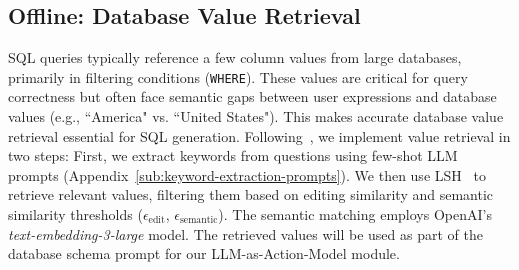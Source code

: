\subsection{Offline: Database Value Retrieval}
\label{sub:offline-preprocess}
SQL queries typically reference a few column values from large databases, primarily in filtering conditions (\eg \texttt{WHERE}). These values are critical for query correctness but often face semantic gaps between user expressions and database values (e.g., ``America" vs. ``United States"). This makes accurate database value retrieval essential for SQL generation. Following~\citet{chesssql}, we implement value retrieval in two steps:
% 
First, we extract keywords from questions using few-shot LLM prompts ({Appendix}~\ref{sub:keyword-extraction-prompts}). We then use LSH~\cite{LSH} to retrieve relevant values, filtering them based on editing similarity and semantic similarity thresholds ($\epsilon_\text{edit}$, $\epsilon_\text{semantic}$). The semantic matching employs OpenAI's \textit{text-embedding-3-large} model. 
The retrieved values will be used as part of the database schema prompt for our LLM-as-Action-Model module.

